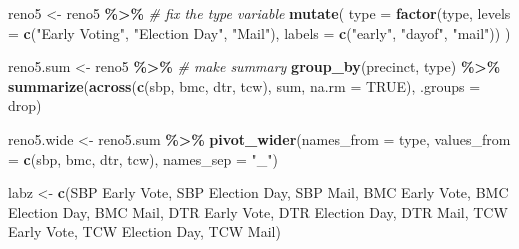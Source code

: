 \documentclass[10pt]{article}
\newenvironment{Shaded}{\begin{snugshade}}{\end{snugshade}}
\newcommand{\AttributeTok}[1]{\textcolor[rgb]{0.13,0.29,0.53}{#1}}
\newcommand{\CommentTok}[1]{\textcolor[rgb]{0.56,0.35,0.01}{\textit{#1}}}
\newcommand{\ConstantTok}[1]{\textcolor[rgb]{0.56,0.35,0.01}{#1}}
\newcommand{\FunctionTok}[1]{\textcolor[rgb]{0.13,0.29,0.53}{\textbf{#1}}}
\newcommand{\NormalTok}[1]{#1}
\newcommand{\OtherTok}[1]{\textcolor[rgb]{0.56,0.35,0.01}{#1}}
\newcommand{\SpecialCharTok}[1]{\textcolor[rgb]{0.81,0.36,0.00}{\textbf{#1}}}
\newcommand{\StringTok}[1]{\textcolor[rgb]{0.31,0.60,0.02}{#1}}
\begin{document}
\begin{Shaded}
\begin{Highlighting}[]
\NormalTok{reno5 }\OtherTok{\textless{}{-}}\NormalTok{ reno5 }\SpecialCharTok{\%\textgreater{}\%} \CommentTok{\# fix the type variable}
  \FunctionTok{mutate}\NormalTok{(}
    \AttributeTok{type =} \FunctionTok{factor}\NormalTok{(type, }
                  \AttributeTok{levels =} \FunctionTok{c}\NormalTok{(}\StringTok{"Early Voting"}\NormalTok{, }\StringTok{"Election Day"}\NormalTok{, }\StringTok{"Mail"}\NormalTok{),}
                  \AttributeTok{labels =} \FunctionTok{c}\NormalTok{(}\StringTok{"early"}\NormalTok{, }\StringTok{"dayof"}\NormalTok{, }\StringTok{"mail"}\NormalTok{))}
\NormalTok{  )}

\NormalTok{reno5.sum }\OtherTok{\textless{}{-}}\NormalTok{ reno5 }\SpecialCharTok{\%\textgreater{}\%} \CommentTok{\# make summary}
  \FunctionTok{group\_by}\NormalTok{(precinct, type) }\SpecialCharTok{\%\textgreater{}\%}
  \FunctionTok{summarize}\NormalTok{(}\FunctionTok{across}\NormalTok{(}\FunctionTok{c}\NormalTok{(sbp, bmc, dtr, tcw), }
\NormalTok{                   sum, }
                   \AttributeTok{na.rm =} \ConstantTok{TRUE}\NormalTok{), }
            \AttributeTok{.groups =} \StringTok{\textquotesingle{}drop\textquotesingle{}}\NormalTok{)}

\NormalTok{reno5.wide }\OtherTok{\textless{}{-}}\NormalTok{ reno5.sum }\SpecialCharTok{\%\textgreater{}\%}
  \FunctionTok{pivot\_wider}\NormalTok{(}\AttributeTok{names\_from =}\NormalTok{ type, }
              \AttributeTok{values\_from =} \FunctionTok{c}\NormalTok{(sbp, bmc, dtr, tcw), }
              \AttributeTok{names\_sep =} \StringTok{"\_"}\NormalTok{)}

\NormalTok{labz }\OtherTok{\textless{}{-}} \FunctionTok{c}\NormalTok{(}\StringTok{\textquotesingle{}SBP Early Vote\textquotesingle{}}\NormalTok{, }\StringTok{\textquotesingle{}SBP Election Day\textquotesingle{}}\NormalTok{, }\StringTok{\textquotesingle{}SBP Mail\textquotesingle{}}\NormalTok{,}
          \StringTok{\textquotesingle{}BMC Early Vote\textquotesingle{}}\NormalTok{, }\StringTok{\textquotesingle{}BMC Election Day\textquotesingle{}}\NormalTok{, }\StringTok{\textquotesingle{}BMC Mail\textquotesingle{}}\NormalTok{,}
          \StringTok{\textquotesingle{}DTR Early Vote\textquotesingle{}}\NormalTok{, }\StringTok{\textquotesingle{}DTR Election Day\textquotesingle{}}\NormalTok{, }\StringTok{\textquotesingle{}DTR Mail\textquotesingle{}}\NormalTok{,}
          \StringTok{\textquotesingle{}TCW Early Vote\textquotesingle{}}\NormalTok{, }\StringTok{\textquotesingle{}TCW Election Day\textquotesingle{}}\NormalTok{, }\StringTok{\textquotesingle{}TCW Mail\textquotesingle{}}\NormalTok{)}


\end{Highlighting}
\end{Shaded}
\end{document}
